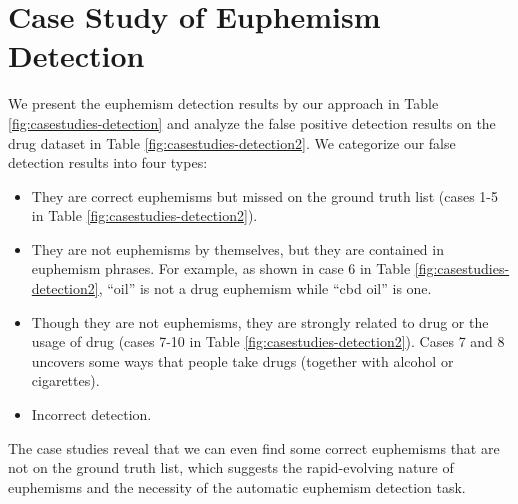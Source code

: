 \section{Case Study of Euphemism Detection}
\label{sec:appendix}

We present the euphemism detection results by our approach in Table \ref{fig:casestudies-detection} and analyze the false positive detection results on the drug dataset in Table \ref{fig:casestudies-detection2}. 
We categorize our false detection results into four types: 
\begin{itemize}
	\item They are correct euphemisms but missed on the ground truth list (cases 1-5 in Table \ref{fig:casestudies-detection2}). 
	\item They are not euphemisms by themselves, but they are contained in euphemism phrases. For example, as shown in case 6 in Table \ref{fig:casestudies-detection2}, ``oil'' is not a drug euphemism while ``cbd oil'' is one. 
	\item Though they are not euphemisms, they are strongly related to drug or the usage of drug (cases 7-10 in Table \ref{fig:casestudies-detection2}). Cases 7 and 8 uncovers some ways that people take drugs (together with alcohol or cigarettes).
	\item Incorrect detection. 
\end{itemize}

The case studies reveal that we can even find some correct euphemisms that are not on the ground truth list, which suggests the rapid-evolving nature of euphemisms and the necessity of the automatic euphemism detection task. 
